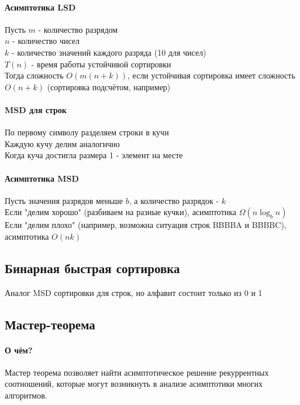 \documentclass[a4paper,10pt]{article}
\begin{document}
	\paragraph{Асимптотика LSD}
	Пусть $m$ - количество разрядом \\
	$n$ - количество чисел \\
	$k$ - количество значений каждого разряда (10 для чисел) \\
	$T(n)$ - время работы устойчивой сортировки \\
	Тогда сложность $O(m(n+k))$, если устойчивая сортировка имеет сложность $O(n+k)$ (сортировка подсчётом, например)
	\paragraph{MSD для строк}
	По первому символу разделяем строки в кучи \\
	Каждую кучу делим аналогично \\
	Когда куча достигла размера 1 - элемент на месте
	\paragraph{Асимптотика MSD}
	Пусть значения разрядов меньше $b$, а количество разрядок - $k$ \\
	Если "делим хорошо" (разбиваем на разные кучки), асимптотика $\Omega(n\log_{b}n)$ \\
	Если "делим плохо" (например, возможна ситуация строк BBBBA и BBBBC), асимптотика $O(nk)$ \\
	\subsection{Бинарная быстрая сортировка}
	Аналог MSD сортировки для строк, но алфавит состоит только из 0 и 1 
	\subsection{Мастер-теорема}
	\paragraph{О чём?} Мастер теорема позволяет найти асимптотическое решение рекуррентных соотношений, которые могут возникнуть в анализе асимптотики многих алгоритмов.
\end{document}
